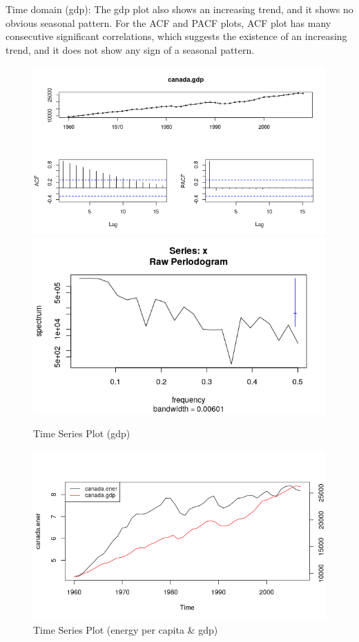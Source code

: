 \documentclass[journal, a4paper]{IEEEtran}
\begin{document}
Time domain (gdp): The gdp plot also shows an increasing trend, and it shows no obvious seasonal pattern. For the ACF and PACF plots, ACF plot has many consecutive significant correlations, which suggests the existence of an increasing trend, and it does not show any sign of a seasonal pattern.
\begin{figure}[H]
\begin{center}
\includegraphics[scale=0.45]{fig2/tsdisplay_gdp.png}
\includegraphics[scale=0.4]{fig2/periodogram_gdp.png}
\caption{Time Series Plot (gdp)}
\label{fig2:gdp}
\end{center}
\end{figure}

\begin{figure}[H]
\begin{center}
\includegraphics[scale=0.4]{fig2/both_plot.png}
\caption{Time Series Plot (energy per capita \& gdp)}
\label{fig2:both}
\end{center}
\end{figure}
\end{document}
